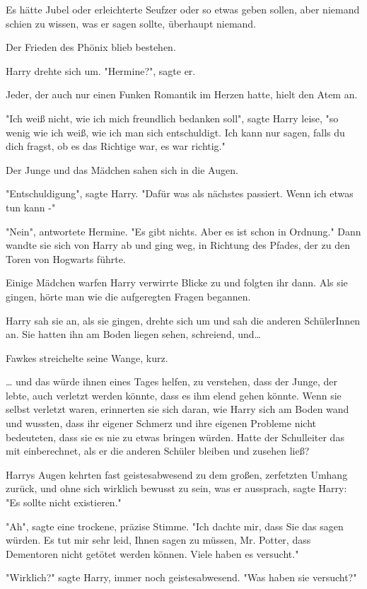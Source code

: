 {Es hätte Jubel oder erleichterte Seufzer oder so etwas geben sollen, aber niemand schien zu wissen, was er sagen sollte, überhaupt niemand.

Der Frieden des Phönix blieb bestehen.

Harry drehte sich um. "Hermine?", sagte er.

Jeder, der auch nur einen Funken Romantik im Herzen hatte, hielt den Atem an.

"Ich weiß nicht, wie ich mich freundlich bedanken soll", sagte Harry leise, "so wenig wie ich weiß, wie ich man sich entschuldigt. Ich kann nur sagen, falls du dich fragst, ob es das Richtige war, es war richtig."

Der Junge und das Mädchen sahen sich in die Augen.

"Entschuldigung", sagte Harry. "Dafür was als nächstes passiert. Wenn ich etwas tun kann -"

"Nein", antwortete Hermine. "Es gibt nichts. Aber es ist schon in Ordnung." Dann wandte sie sich von Harry ab und ging weg, in Richtung des Pfades, der zu den Toren von Hogwarts führte.

Einige Mädchen warfen Harry verwirrte Blicke zu und folgten ihr dann. Als sie gingen, hörte man wie die aufgeregten Fragen begannen.

Harry sah sie an, als sie gingen, drehte sich um und sah die anderen SchülerInnen an. Sie hatten ihn am Boden liegen sehen, schreiend, und…

Fawkes streichelte seine Wange, kurz.

… und das würde ihnen eines Tages helfen, zu verstehen, dass der Junge, der lebte, auch verletzt werden könnte, dass es ihm elend gehen könnte. Wenn sie selbst verletzt waren, erinnerten sie sich daran, wie Harry sich am Boden wand und wussten, dass ihr eigener Schmerz und ihre eigenen Probleme nicht bedeuteten, dass sie es nie zu etwas bringen würden. Hatte der Schulleiter das mit einberechnet, als er die anderen Schüler bleiben und zusehen ließ?

Harrys Augen kehrten fast geistesabwesend zu dem großen, zerfetzten Umhang zurück, und ohne sich wirklich bewusst zu sein, was er aussprach, sagte Harry: "Es sollte nicht existieren."

"Ah", sagte eine trockene, präzise Stimme. "Ich dachte mir, dass Sie das sagen würden. Es tut mir sehr leid, Ihnen sagen zu müssen, Mr. Potter, dass Dementoren nicht getötet werden können. Viele haben es versucht."

"Wirklich?" sagte Harry, immer noch geistesabwesend. "Was haben sie versucht?"

}
